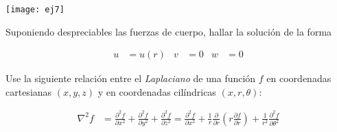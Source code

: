 \documentclass[a4paper,10pt,twoside,final,spanish]{article}
\begin{document}
\begin{center}
\texttt{[image: ej7]}
\end{center}

Suponiendo despreciables las fuerzas de cuerpo, hallar la solución de la forma

\begin{align*}
u &= u(r) & v &= 0 & w &= 0
\end{align*}

Use la siguiente relación entre el \textit{Laplaciano} de una función $f$ en coordenadas cartesianas $(x,y,z)$ y en coordenadas cilíndricas $(x,r,\theta)$:

\begin{align*}
\nabla^{2}f &= \frac{\partial^{2}f}{\partial x^{2}}
+\frac{\partial^{2}f}{\partial y^{2}}+\frac{\partial^{2}f}{\partial z^{2}}
=\frac{\partial^{2}f}{\partial x^{2}}
+\frac{1}{r}\frac{\partial}{\partial r}\left(r\frac{\partial f}{\partial r}\right)
+\frac{1}{r^{2}}\frac{\partial^{2}f}{\partial\theta^{2}}
\end{align*}
\end{document}
